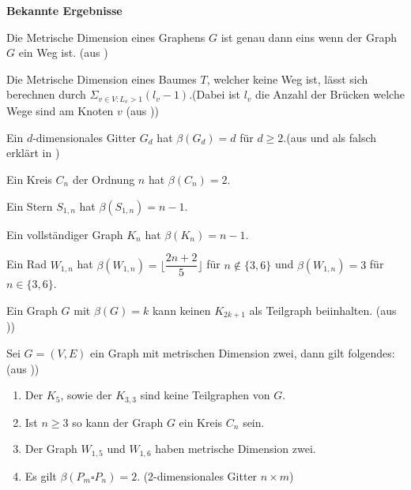 \textbf{Bekannte Ergebnisse}\\
\begin{lem}
\label{path}
Die Metrische Dimension eines Graphens $G$ ist genau dann eins wenn der Graph $G$ ein Weg ist. (aus \cite{Landmarks})
\end{lem}
\begin{lem}
Die Metrische Dimension eines Baumes $T$, welcher keine Weg ist, lässt sich berechnen durch $\Sigma_{v \in V:L_v >1} (l_v-1)$.(Dabei ist $l_v$ die Anzahl der Brücken welche Wege sind am Knoten $v$ (aus \cite{Landmarks}))
\end{lem}
\begin{lem} 
Ein $d$-dimensionales Gitter $G_d$ hat $\beta(G_d)=d$ für $d \geq 2$.(aus \cite{Landmarks} und als falsch erklärt in \cite{some families of graphs})
\end{lem}
\begin{lem}
Ein Kreis $C_n$ der Ordnung $n$ hat $\beta(C_n)=2$.
\end{lem}
\begin{lem}
\label{stern}
Ein Stern $S_{1,n}$ hat $\beta(S_{1,n})=n-1$.
\end{lem}
\begin{lem}
Ein vollständiger Graph $K_n$ hat $\beta(K_n)=n-1$.
\end{lem}
\begin{lem}
\label{rad}
Ein Rad $W_{1,n}$ hat $\beta(W_{1,n})= \lfloor \dfrac{2n+2}{5} \rfloor$ für $n \notin \{3,6\}$ und $\beta(W_{1,n})=3$ für $n \in \{3,6\}$.
\end{lem}
\begin{lem}
Ein Graph $G$ mit $\beta(G) = k$ kann keinen $K_{2k+1}$ als Teilgraph beiinhalten. (aus \cite{Landmarks}))
\end{lem}
\begin{lem}
Sei $G = (V, E)$ ein Graph mit metrischen Dimension zwei, dann gilt folgendes: (aus \cite{Landmarks}))
\begin{enumerate}
\item Der $K_{5}$, sowie der $K_{3,3}$ sind keine Teilgraphen von $G$.
\item Ist $n \geq 3$ so kann der Graph $G$ ein Kreis $C_n$ sein.
\item Der Graph $W_{1,5}$ und $W_{1,6}$ haben metrische Dimension zwei.
\item Es gilt $\beta(P_m \square P_n)=2$. (2-dimensionales Gitter $n \times m$)
\end{enumerate}
\end{lem}


